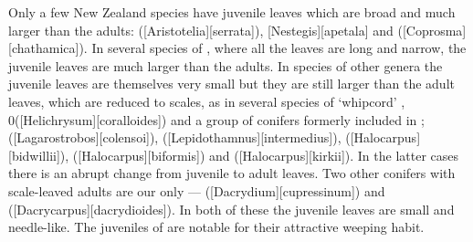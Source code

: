 Only a few New Zealand species have juvenile leaves which are broad and much larger than the adults:  ([Aristotelia][serrata]), [Nestegis][apetala] and  ([Coprosma][chathamica]).
In several species of , where all the leaves are long and narrow, the juvenile leaves are much larger than the adults.
In species of other genera the juvenile leaves are themselves very small but they are still larger than the adult leaves, which are reduced to scales, as in several species of `whipcord' , 0([Helichrysum][coralloides]) and a group of conifers formerly included in ;  ([Lagarostrobos][colensoi]),  ([Lepidothamnus][intermedius]),  ([Halocarpus][bidwillii]),  ([Halocarpus][biformis]) and  ([Halocarpus][kirkii]).
In the latter cases there is an abrupt change from juvenile to adult leaves.
Two other conifers with scale-leaved adults are our only  ---  ([Dacrydium][cupressinum]) and  ([Dacrycarpus][dacrydioides]).
In both of these the juvenile leaves are small and needle-like.
The juveniles of  are notable for their attractive weeping habit.

